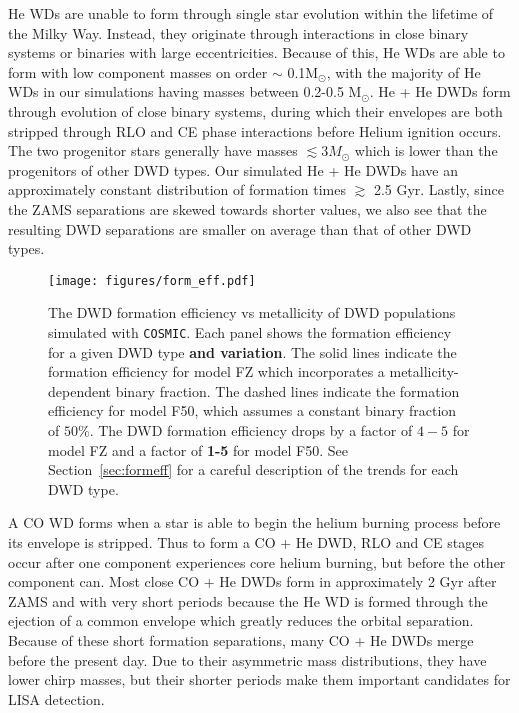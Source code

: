 \documentclass[twocolumn, linenumbers]{aastex631}
\newcommand{\cosmic}{\texttt{COSMIC}}
\begin{document}
He WDs are unable to form through single star evolution within the lifetime of the Milky Way. Instead, they originate through interactions in close binary systems or binaries with large eccentricities. Because of this, He WDs are able to form with low component masses on order $\sim$ 0.1M$_\odot$, with the majority of He WDs in our simulations having masses between 0.2-0.5 M$_\odot$. He + He DWDs form through evolution of close binary systems, during which their envelopes are both stripped through RLO and CE phase interactions before Helium ignition occurs. The two progenitor stars generally have masses $\lesssim 3 M_\odot$ which is lower than the progenitors of other DWD types. Our simulated He + He DWDs have an approximately constant distribution of formation times $\gtrsim$ 2.5 Gyr. Lastly, since the ZAMS separations are skewed towards shorter values, we also see that the resulting DWD separations are smaller on average than that of other DWD types. 

\begin{figure*}
	\texttt{[image: figures/form\_eff.pdf]}
    \caption{The DWD formation efficiency vs metallicity of DWD populations simulated with \cosmic. Each panel shows the formation efficiency for a given DWD type \textbf{and variation}. The solid lines indicate the formation efficiency for model FZ which incorporates a metallicity-dependent binary fraction. The dashed lines indicate the formation efficiency for model F50, which assumes a constant binary fraction of $50\%$. The DWD formation efficiency drops by a factor of $4-5$ for model FZ and a factor of \textbf{1-5} for model F50. See Section~\ref{sec:formeff} for a careful description of the trends for each DWD type.}
    \label{fig:form_eff}
\end{figure*}


A CO WD forms when a star is able to begin the helium burning process before its envelope is stripped. Thus to form a CO + He DWD, RLO and CE stages occur after one component experiences core helium burning, but before the other component can. Most close CO + He DWDs form in approximately 2 Gyr after ZAMS and with very short periods because the He WD is formed through the ejection of a common envelope which greatly reduces the orbital separation. Because of these short formation separations, many CO + He DWDs merge before the present day. Due to their asymmetric mass distributions, they have lower chirp masses, but their shorter periods make them important candidates for LISA detection. 
\end{document}

